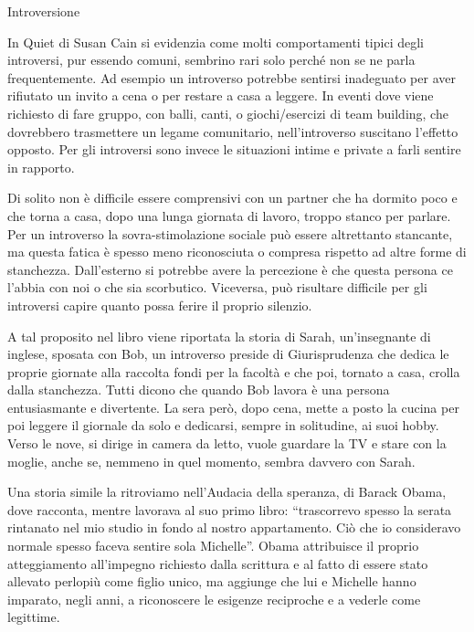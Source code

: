 \documentclass[12pt]{book} %
\begin{document}
\begin{mdframed}[linewidth=1pt]
Introversione

In Quiet di Susan Cain si evidenzia come molti comportamenti tipici degli introversi, pur essendo comuni, sembrino rari solo perché non se ne parla frequentemente. Ad esempio un introverso potrebbe sentirsi inadeguato per aver rifiutato un invito a cena o per restare a casa a leggere. In eventi dove
viene richiesto di fare gruppo, con balli, canti, o giochi/esercizi di team building, che dovrebbero trasmettere un
legame comunitario, nell'introverso suscitano l'effetto opposto. Per gli
introversi sono invece le situazioni intime e private a farli sentire in rapporto.

Di solito non è difficile essere comprensivi con un partner che ha dormito poco e che torna a casa, dopo una lunga
giornata di lavoro, troppo stanco per parlare. Per un introverso la sovra-stimolazione sociale può essere altrettanto
stancante, ma questa fatica è spesso meno riconosciuta o compresa rispetto ad altre forme di stanchezza. Dall'esterno si potrebbe avere la percezione è che questa persona ce l'abbia con noi o che sia scorbutico. Viceversa, può risultare difficile per gli introversi capire quanto possa ferire il proprio silenzio. 

A tal proposito nel libro viene riportata la storia di Sarah, un'insegnante di inglese, sposata con Bob, un introverso
preside di Giurisprudenza che dedica le proprie giornate alla raccolta fondi per la facoltà e che poi, tornato a casa,
crolla dalla stanchezza. Tutti dicono che quando Bob lavora è una
persona entusiasmante e divertente. La sera però, dopo cena, mette a posto la cucina per poi leggere il giornale da solo e
dedicarsi, sempre in solitudine, ai suoi hobby. Verso le nove, si dirige in camera da letto, vuole
guardare la TV e stare con la moglie, anche se, nemmeno in quel momento, sembra davvero con Sarah.

Una storia simile la ritroviamo nell'Audacia della speranza, di Barack Obama, dove racconta, mentre lavorava al suo primo libro: 
“trascorrevo spesso la serata rintanato nel mio studio in fondo al nostro
appartamento. Ciò che io consideravo normale spesso faceva sentire sola Michelle”. Obama attribuisce il proprio
atteggiamento all'impegno richiesto dalla scrittura e al fatto di essere stato allevato perlopiù come figlio unico, ma
aggiunge che lui e Michelle hanno imparato, negli anni, a riconoscere le esigenze reciproche e a vederle come legittime. 


\end{mdframed}
\end{document}
